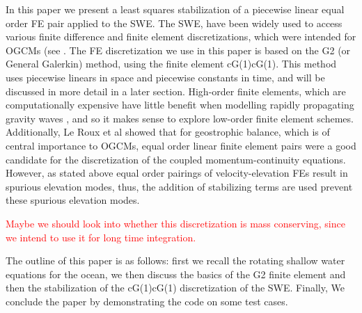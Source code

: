 In this paper we present a least squares stabilization of a piecewise linear
equal order FE pair applied to the SWE. The SWE, have been widely used to access
various finite difference and finite element discretizations, which were
intended for OGCMs (see \cite{Batten1981,Hanert2004,Le-Roux1998,Walters1984}.
The FE discretization we use in this paper is based on the G2 (or General
Galerkin) method, using the finite element cG(1)cG(1). This method uses
piecewise linears in space and piecewise constants in time, and will be
discussed in more detail in a later section. High-order finite elements, which
are computationally expensive have little benefit when modelling rapidly
propagating gravity waves \cite{Le-Roux1998}, and so it makes sense to explore
low-order finite element schemes. Additionally, Le Roux et al \cite{Le-Roux1998}
showed that for geostrophic balance, which is of central importance to OGCMs,
equal order linear finite element pairs were a good candidate for the
discretization of the coupled momentum-continuity equations. However, as stated
above equal order pairings of velocity-elevation FEs result in spurious
elevation modes, thus, the addition of stabilizing terms are used prevent these
spurious elevation modes. 

\textcolor{red}{Maybe we should look into whether this discretization is mass
conserving, since we intend to use it for long time integration.}

The outline of this paper is as follows: first we recall the rotating shallow
water equations for the ocean, we then discuss the basics of the G2 finite
element and then the stabilization of the cG(1)cG(1) discretization of the SWE.
Finally, We conclude the paper by demonstrating the code on some test cases.
